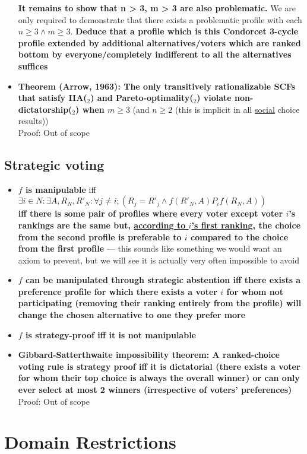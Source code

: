 \documentclass[20pt,a4paper,landscape]{extarticle}
\begin{document}
\begin{flushleft}
\begin{itemize}
\clearpage
\textbf{It remains to show that n > 3, m > 3 are also problematic.} We are only required to demonstrate that there exists a problematic profile with each $n \geq 3 \land m \geq 3$. \textbf{Deduce that a profile which is this Condorcet 3-cycle profile extended by additional alternatives/voters which are ranked bottom by everyone/completely indifferent to all the alternatives suffices}
\item \textbf{Theorem (Arrow, 1963): The only transitively rationalizable SCFs that satisfy IIA($_2$) and Pareto-optimality($_2$) violate non-dictatorship($_2$) when $m \geq 3$} (and $n \geq 2$ (this is implicit in all \underline{social} choice results))\\
Proof: Out of scope
\end{itemize}
\clearpage
\subsection{Strategic voting}
\begin{itemize}
\item \textbf{$f$ is manipulable} iff $\exists i \in N: \exists A, R_N, R'_N: \forall j \neq i; (R_j = R'_j \land f(R'_N, A) P_i f(R_N, A))$\\
\textbf{iff there is some pair of profiles where every voter except voter $i$'s rankings are the same but, \underline{according to $i$'s first ranking}, the choice from the second profile is preferable to $i$ compared to the choice from the first profile} --- this sounds like something we would want an axiom to prevent, but we will see it is actually very often impossible to avoid
\item{\textbf{$f$ can be manipulated through strategic abstention iff there exists a preference profile for which there exists a voter $i$ for whom not participating (removing their ranking entirely from the profile) will change the chosen alternative to one they prefer more}}
\item \textbf{$f$ is strategy-proof iff it is not manipulable}
\item \textbf{Gibbard-Satterthwaite impossibility theorem: A ranked-choice voting rule is strategy proof iff it is dictatorial (there exists a voter for whom their top choice is always the overall winner) or can only ever select at most 2 winners (irrespective of voters' preferences)}\\
Proof: Out of scope
\end{itemize}
\clearpage
\section{Domain Restrictions}

\end{flushleft}
\end{document}
